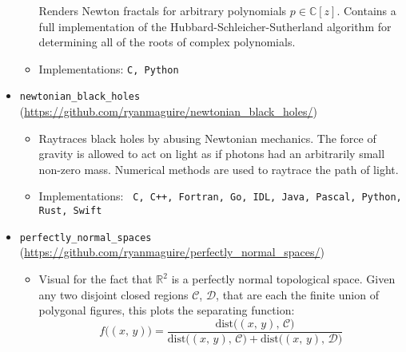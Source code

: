 \documentclass[a4paper,sans]{moderncv}
\begin{document}
\begin{itemize}
\begin{itemize}
                        Renders Newton fractals for arbitrary polynomials
                        $p\in\mathbb{C}[z]$. Contains a full implementation of
                        the Hubbard-Schleicher-Sutherland algorithm for
                        determining all of the roots of complex polynomials.
                    \item
                        Implementations: \texttt{C, Python}
                \end{itemize}
            \item
                \texttt{newtonian\_black\_holes}
                (\url{https://github.com/ryanmaguire/newtonian_black_holes/})
                \begin{itemize}
                    \item
                        Raytraces black holes by abusing Newtonian mechanics.
                        The force of gravity is allowed to act on light as if
                        photons had an arbitrarily small non-zero mass.
                        Numerical methods are used to raytrace the path of
                        light.
                    \item
                        Implementations:
                        \texttt{%
                            C, C++, Fortran, Go, IDL, Java,
                            Pascal, Python, Rust, Swift%
                        }
                \end{itemize}
            \item
                \texttt{perfectly\_normal\_spaces}
                (\url{https://github.com/ryanmaguire/perfectly_normal_spaces/})
                \begin{itemize}
                    \item
                        Visual for the fact that $\mathbb{R}^{2}$ is a perfectly
                        normal topological space. Given any two disjoint closed
                        regions $\mathcal{C}$, $\mathcal{D}$, that are each the
                        finite union of polygonal figures, this plots the
                        separating function:
                        \begin{equation}
                            f\big((x,\,y)\big)
                            =\frac{\textrm{dist}\big((x,\,y),\,\mathcal{C}\big)}
                            {\textrm{dist}\big((x,\,y),\,\mathcal{C}\big)+
                             \textrm{dist}\big((x,\,y),\,\mathcal{D}\big)}
                        \end{equation}

\end{itemize}
\end{itemize}
\end{document}
